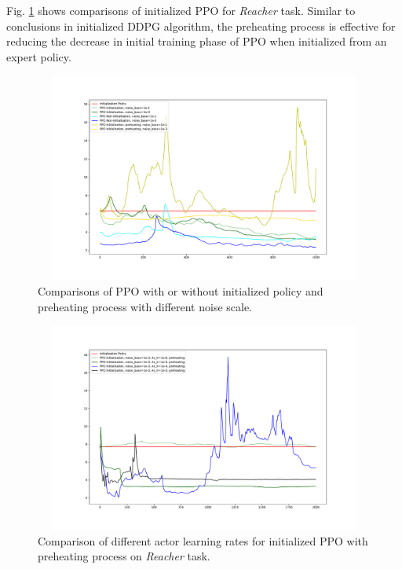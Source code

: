 \documentclass{article}
\begin{document}
Fig. \ref{fig:ppo1} shows comparisons of initialized PPO for \textit{Reacher} task. Similar to conclusions in initialized DDPG algorithm, the preheating process is effective for reducing the decrease in initial training phase of PPO when initialized from an expert policy.
\begin{figure}[htbp]
	\centering
	\includegraphics[height=260, width=450]{img/ppo_compare2.pdf}
	\caption{Comparisons of PPO with or without initialized policy and preheating process with different noise scale.}
	\label{fig:ppo1}
\end{figure}

\begin{figure}[htbp]
	\centering
	\includegraphics[height=260, width=450]{img/ppo_compare3.pdf}
	\caption{Comparison of different actor learning rates for initialized PPO with preheating process on \textit{Reacher} task.}
	\label{fig:ppo2}
\end{figure}
\end{document}
